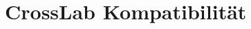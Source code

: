 \section{CrossLab Kompatibilität}\label{section:prototypische-implementierung:crosslab-kompatibilität}